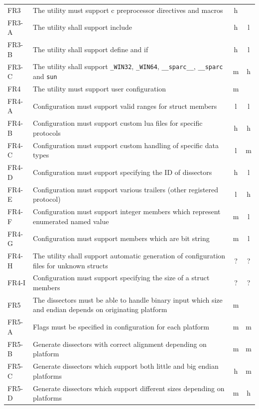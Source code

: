\begin{table}[htbp]
{\begin{tabularx}{1.2\textwidth}{l X c c}
	\midrule
	FR3 & The \gls{utility} must support \Gls{c} \gls{preprocessor} directives and macros & \Gls{h} & \\
	FR3-A & The \gls{utility} shall support \gls{include} & \Gls{h} & \Gls{l} \\
	FR3-B & The \gls{utility} shall support \gls{define} and \gls{if} & \Gls{h} & \Gls{l} \\
	FR3-C & The \gls{utility} shall support \verb+_WIN32+, \verb+_WIN64+, \verb+__sparc__+, \verb+__sparc+ and \verb+sun+ & \Gls{m} & \Gls{h} \\
	\midrule
	FR4 & The \gls{utility} must support user configuration & \Gls{m} & \\
	FR4-A & Configuration must support valid ranges for \gls{struct} \glspl{member} & \Gls{l} & \Gls{l} \\
	FR4-B & Configuration must support custom \Gls{lua} files for specific \glspl{protocol} & \Gls{h} & \Gls{h} \\
	FR4-C & Configuration must support custom handling of specific data types & \Gls{l} & \Gls{m} \\
	FR4-D & Configuration must support specifying the ID of \glspl{dissector} & \Gls{h} & \Gls{l} \\
	FR4-E & Configuration must support various trailers (other registered \gls{protocol}) & \Gls{l} & \Gls{h} \\
	FR4-F & Configuration must support integer \glspl{member} which represent enumerated named value & \Gls{m} & \Gls{l} \\	
	FR4-G & Configuration must support \glspl{member} which are \gls{bit string} & \Gls{m} & \Gls{l} \\
	FR4-H & The utility shall support automatic generation of configuration files for unknown structs & ? & ? \\
	FR4-I & Configuration must support specifying the size of a struct members & ? & ? \\
	\midrule
	FR5 & The \glspl{dissector} must be able to handle \gls{binary} input which size and \gls{endian} depends on originating platform & \Gls{m} & \\
	FR5-A & Flags must be specified in configuration for each platform & \Gls{m} & \Gls{m} \\
	FR5-B & Generate \glspl{dissector} with correct alignment depending on platform & \Gls{m} & \Gls{m} \\
	FR5-C & Generate \glspl{dissector} which support both little and big \gls{endian} platforms & \Gls{h} & \Gls{m} \\
	FR5-D & Generate \glspl{dissector} which support different sizes depending on platforms & \Gls{m} & \Gls{h} \\
	\bottomrule
\end{tabularx}}
\end{table}

